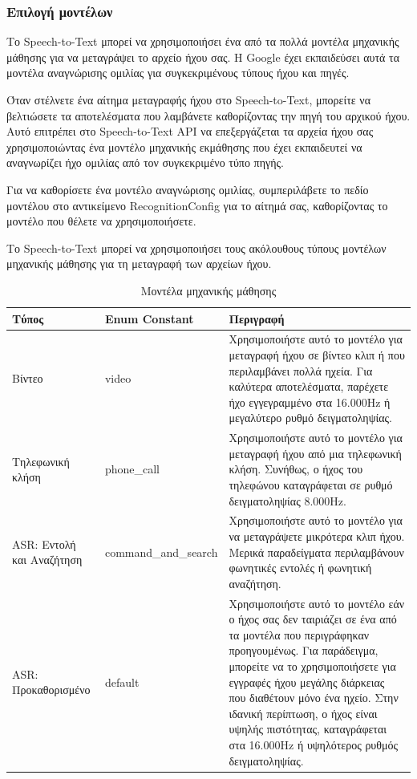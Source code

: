 \documentclass[oneside, 12pt]{book}
\begin{document}
\subsubsection{Επιλογή μοντέλων}
Το Speech-to-Text μπορεί να χρησιμοποιήσει ένα από τα πολλά μοντέλα μηχανικής μάθησης για να μεταγράψει το αρχείο ήχου σας. Η Google έχει εκπαιδεύσει αυτά τα μοντέλα αναγνώρισης ομιλίας για συγκεκριμένους τύπους ήχου και πηγές.

Όταν στέλνετε ένα αίτημα μεταγραφής ήχου στο Speech-to-Text, μπορείτε να βελτιώσετε τα αποτελέσματα που λαμβάνετε καθορίζοντας την πηγή του αρχικού ήχου. Αυτό επιτρέπει στο Speech-to-Text API να επεξεργάζεται τα αρχεία ήχου σας χρησιμοποιώντας ένα μοντέλο μηχανικής εκμάθησης που έχει εκπαιδευτεί να αναγνωρίζει ήχο ομιλίας από τον συγκεκριμένο τύπο πηγής.

Για να καθορίσετε ένα μοντέλο αναγνώρισης ομιλίας, συμπεριλάβετε το πεδίο μοντέλου στο αντικείμενο RecognitionConfig για το αίτημά σας, καθορίζοντας το μοντέλο που θέλετε να χρησιμοποιήσετε.

Το Speech-to-Text μπορεί να χρησιμοποιήσει τους ακόλουθους τύπους μοντέλων μηχανικής μάθησης για τη μεταγραφή των αρχείων ήχου.
\begin{table}[H]
  \centering
  \caption{Μοντέλα μηχανικής μάθησης}
  \begin{tabularx}{\linewidth}[h]{|p{2cm}|p{4cm}|X|}
    \hline
    Τύπος & Enum Constant & Περιγραφή \\
    \hline
    \hline
    Βίντεο & video & Χρησιμοποιήστε αυτό το μοντέλο για μεταγραφή ήχου σε βίντεο κλιπ ή που περιλαμβάνει πολλά ηχεία. Για καλύτερα αποτελέσματα, παρέχετε ήχο εγγεγραμμένο στα 16.000Hz ή μεγαλύτερο ρυθμό δειγματοληψίας. \\
    \hline
    Τηλεφωνική κλήση & phone\_call & Χρησιμοποιήστε αυτό το μοντέλο για μεταγραφή ήχου από μια τηλεφωνική κλήση. Συνήθως, ο ήχος του τηλεφώνου καταγράφεται σε ρυθμό δειγματοληψίας 8.000Hz. \\
    \hline
    ASR: Εντολή και Αναζήτηση & command\_and\_search & Χρησιμοποιήστε αυτό το μοντέλο για να μεταγράψετε μικρότερα κλιπ ήχου. Μερικά παραδείγματα περιλαμβάνουν φωνητικές εντολές ή φωνητική αναζήτηση. \\
    \hline
    ASR: Προκαθορισμένο & default & Χρησιμοποιήστε αυτό το μοντέλο εάν ο ήχος σας δεν ταιριάζει σε ένα από τα μοντέλα που περιγράφηκαν προηγουμένως. Για παράδειγμα, μπορείτε να το χρησιμοποιήσετε για εγγραφές ήχου μεγάλης διάρκειας που διαθέτουν μόνο ένα ηχείο. Στην ιδανική περίπτωση, ο ήχος είναι υψηλής πιστότητας, καταγράφεται στα 16.000Hz ή υψηλότερος ρυθμός δειγματοληψίας. \\
    \hline
  \end{tabularx}
\end{table}
\newpage
\end{document}

